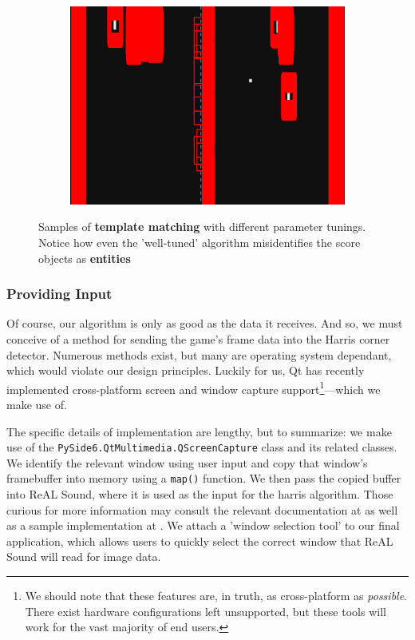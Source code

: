 \documentclass{report}
\newcommand{\rs}{ReAL Sound\xspace}
\newcommand{\state}[1]{\textbf{#1}}
\newcommand{\tech}[1]{\textbf{#1}}
\begin{document}
\begin{figure}
\begin{subfigure}{\linewidth}
        \includegraphics[height=0.26\textheight]{tempHigh.png}
    \end{subfigure}
    \caption{Samples of \tech{template matching} with different parameter tunings. Notice how even the 'well-tuned' algorithm misidentifies the score objects as \state{entities}}
    \label{fig:template}    
\end{figure}


\subsubsection{Providing Input}
Of course, our algorithm is only as good as the data it receives. And so, we must conceive of a method for sending the game's frame data into the Harris corner detector. Numerous methods exist, but many are operating system dependant, which would violate our design principles. Luckily for us, Qt has recently implemented cross-platform screen and window capture support\footnote{We should note that these features are, in truth, as cross-platform as \emph{possible}. There exist hardware configurations left unsupported, but these tools will work for the vast majority of end users.}---which we make use of.
 
The specific details of implementation are lengthy, but to summarize: we make use of the \texttt{PySide6.QtMultimedia.QScreenCapture} class and its related classes. We identify the relevant window using user input and copy that window's framebuffer into memory using a \texttt{map()} function. We then pass the copied buffer into \rs, where it is used as the input for the harris algorithm.  Those curious for more information may consult the relevant documentation at \cite{QT_Doc} as well as a sample implementation at \cite{QT_EX}. We attach a 'window selection tool' to our final application, which allows users to quickly select the correct window that \rs will read for image data. 
\end{document}
